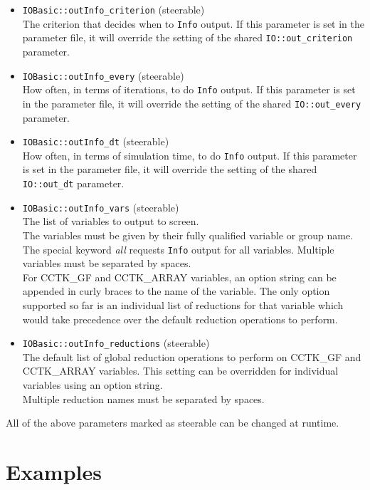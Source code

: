 \documentclass{article}
\begin{document}
\begin{itemize}
  \item {\tt IOBasic::outInfo\_criterion} (steerable)\\
        The criterion that decides when to {\tt Info} output.  If
        this parameter is set in the parameter file, it will override
        the setting of the shared {\tt IO::out\_criterion} parameter.
  \item {\tt IOBasic::outInfo\_every} (steerable)\\
        How often, in terms of iterations, to do {\tt Info} output.
        If this parameter is set in the
        parameter file, it will override the setting of the shared
        {\tt IO::out\_every} parameter.
  \item {\tt IOBasic::outInfo\_dt} (steerable)\\
        How often, in terms of simulation time, to do {\tt Info}
        output.  If this parameter is set in the parameter file, it
        will override the setting of the shared {\tt IO::out\_dt}
        parameter.
  \item {\tt IOBasic::outInfo\_vars} (steerable)\\
        The list of variables to output to screen.\\
        The variables must be given by their fully qualified variable or group
        name. The special keyword {\it all} requests {\tt Info} output for all
        variables. Multiple variables must be separated by spaces.\\
        For CCTK\_GF and CCTK\_ARRAY variables, an option string can
        be appended 
        in curly braces to the name of the variable. The only option
        supported so far is an individual list of reductions for that variable
        which would take precedence over the default reduction operations to
        perform.
  \item {\tt IOBasic::outInfo\_reductions} (steerable)\\
        The default list of global reduction operations to perform on
        CCTK\_GF and CCTK\_ARRAY variables. This setting can be overridden
        for individual variables using an option string.\\
        Multiple reduction names must be separated by spaces.
\end{itemize}
All of the above parameters marked as steerable can be changed at runtime.
%
%
\section{Examples}
%
\end{document}

